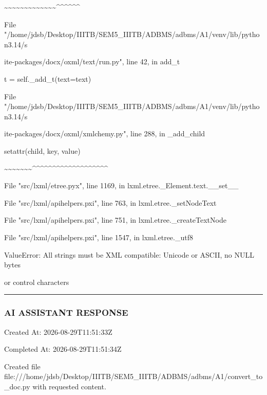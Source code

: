 \documentclass[11pt,a4paper]{article}
\begin{document}
{\textasciitilde{}\textasciitilde{}\textasciitilde{}\textasciitilde{}\textasciitilde{}\textasciitilde{}\textasciitilde{}\textasciitilde{}\textasciitilde{}\textasciitilde{}\textasciitilde{}\textasciitilde{}\textasciitilde{}\textasciicircum{}\textasciicircum{}\textasciicircum{}\textasciicircum{}\textasciicircum{}\textasciicircum{}

File "/home/jdsb/Desktop/IIITB/SEM5\_IIITB/ADBMS/adbms/A1/venv/lib/python3.14/s

ite-packages/docx/oxml/text/run.py", line 42, in add\_t

t = self.\_add\_t(text=text)

File "/home/jdsb/Desktop/IIITB/SEM5\_IIITB/ADBMS/adbms/A1/venv/lib/python3.14/s

ite-packages/docx/oxml/xmlchemy.py", line 288, in \_add\_child

setattr(child, key, value)

\textasciitilde{}\textasciitilde{}\textasciitilde{}\textasciitilde{}\textasciitilde{}\textasciitilde{}\textasciitilde{}\textasciicircum{}\textasciicircum{}\textasciicircum{}\textasciicircum{}\textasciicircum{}\textasciicircum{}\textasciicircum{}\textasciicircum{}\textasciicircum{}\textasciicircum{}\textasciicircum{}\textasciicircum{}\textasciicircum{}\textasciicircum{}\textasciicircum{}\textasciicircum{}\textasciicircum{}\textasciicircum{}\textasciicircum{}

File "src/lxml/etree.pyx", line 1169, in lxml.etree.\_Element.text.\_\_set\_\_

File "src/lxml/apihelpers.pxi", line 763, in lxml.etree.\_setNodeText

File "src/lxml/apihelpers.pxi", line 751, in lxml.etree.\_createTextNode

File "src/lxml/apihelpers.pxi", line 1547, in lxml.etree.\_utf8

ValueError: All strings must be XML compatible: Unicode or ASCII, no NULL bytes

or control characters


\hrule

\subsubsection{AI ASSISTANT RESPONSE}

Created At: 2026-08-29T11:51:33Z

Completed At: 2026-08-29T11:51:34Z

Created file file:///home/jdsb/Desktop/IIITB/SEM5\_IIITB/ADBMS/adbms/A1/convert\_to\_doc.py with requested content.

}
\end{document}
